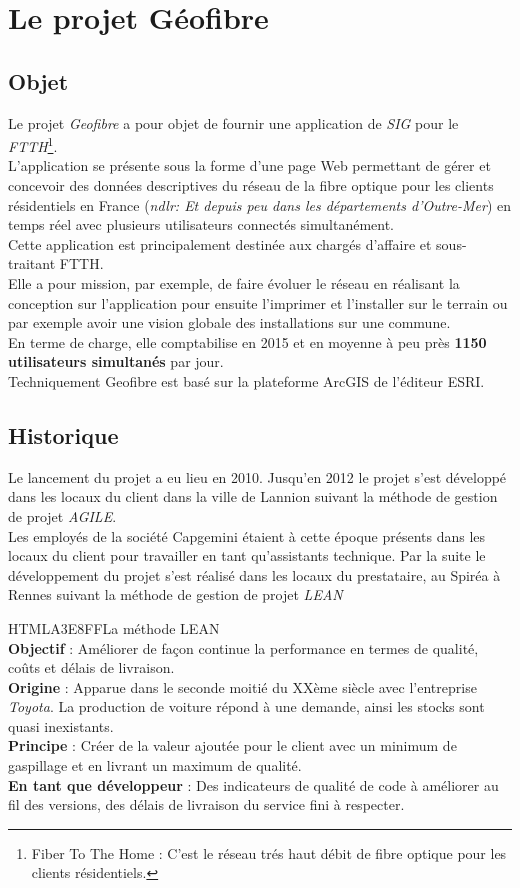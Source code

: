 \chapter{Le projet Géofibre}
\section{Objet}
Le projet \textit{Geofibre} a pour objet de fournir une application de \textit{SIG} pour le \textit{FTTH}\footnote{Fiber To The Home : C'est le réseau trés haut débit de fibre optique pour les clients résidentiels.}.\\
L'application se présente sous la forme d'une page Web permettant de gérer et concevoir des données descriptives du réseau de la fibre optique pour les clients résidentiels en France (\textit{ndlr: Et depuis peu dans les départements d'Outre-Mer}) en temps réel avec plusieurs utilisateurs connectés simultanément.\\
Cette application est principalement destinée aux chargés d'affaire et sous-traitant FTTH.\\
Elle a pour mission, par exemple, de faire évoluer le réseau en réalisant la conception sur l'application pour ensuite l'imprimer et l'installer sur le terrain ou par exemple avoir une vision globale des installations sur une commune.\\
En terme de charge, elle comptabilise en 2015 et en moyenne à peu près \textbf{1150 utilisateurs simultanés} par jour.\\
Techniquement Geofibre est basé sur la plateforme ArcGIS de l'éditeur ESRI.

\newpage
\section{Historique}
Le lancement du projet a eu lieu en 2010. Jusqu'en 2012 le projet s'est développé dans les locaux du client dans la ville de Lannion suivant la méthode de gestion de projet \textit{AGILE}.\\
Les employés de la société Capgemini étaient à cette époque présents dans les locaux du client pour travailler en tant qu'assistants technique.
Par la suite le développement du projet s'est réalisé dans les locaux du prestataire, au Spiréa à Rennes suivant la méthode de gestion de projet \textit{LEAN}

\begin{colbox}{{HTML}{A3E8FF}}{La méthode LEAN\\ }
	\textbf{Objectif} : Améliorer de façon continue la performance en termes de qualité, coûts et délais de livraison.
	\\\textbf{Origine} : Apparue dans le seconde moitié du XXème siècle avec l'entreprise \textit{Toyota}. La production de voiture répond à une demande, ainsi les stocks sont quasi inexistants.
	\\\textbf{Principe} : Créer de la valeur ajoutée pour le client avec un minimum de gaspillage et en livrant un maximum de qualité.
	\\\textbf{En tant que développeur} : Des indicateurs de qualité de code à améliorer au fil des versions, des délais de livraison du service fini à respecter.
\end{colbox}

